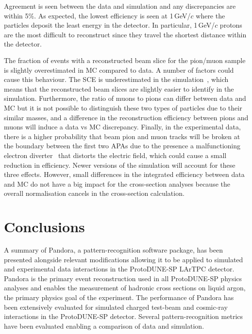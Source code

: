 \documentclass[epjc3]{svjour3}
\begin{document}
Agreement is seen between the data and simulation and any discrepancies are within 5\%. As expected, the lowest efficiency is seen at 1\,GeV/$c$ where the particles deposit the least energy in the detector. In particular, 1\,GeV/$c$ protons are the most difficult to reconstruct since they travel the shortest distance within the detector.

The fraction of events with a reconstructed beam slice for the pion/muon sample is slightly overestimated in MC compared to data. A number of factors could cause this behaviour. The SCE is underestimated in the simulation~\cite{proto_performance}, which means that the reconstructed beam slices are slightly easier to identify in the simulation. Furthermore, the ratio of muons to pions can differ between data and MC but it is not possible to distinguish these two types of particles due to their similar masses, and a difference in the reconstruction efficiency between pions and muons will induce a data vs MC discrepancy. Finally, in the experimental data, there is a higher probability that beam pion and muon tracks will be broken at the boundary between the first two APAs due to the presence a malfunctioning electron diverter~\cite{proto_performance} that distorts the electric field, which could cause a small reduction in efficiency. Newer versions of the simulation will account for these three effects. However, small differences in the integrated efficiency between data and MC do not have a big impact for the cross-section analyses because the overall normalisation cancels in the cross-section calculation.

\section{Conclusions}
\label{sec:conclusion}
A summary of Pandora, a pattern-recognition software package, has been presented alongside relevant modifications allowing it to be applied to simulated and experimental data interactions in the ProtoDUNE-SP LArTPC detector. Pandora is the primary event reconstruction used in all ProtoDUNE-SP physics analyses and enables the measurement of hadronic cross sections on liquid argon, the primary physics goal of the experiment. The performance of Pandora has been extensively evaluated for simulated charged test-beam and cosmic-ray interactions in the ProtoDUNE-SP detector. Several pattern-recognition metrics have been evaluated enabling a comparison of data and simulation.
\end{document}
